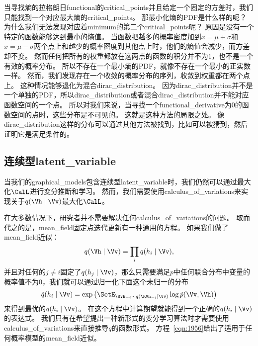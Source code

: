 当寻找熵的拉格朗日\gls{functional}的\gls{critical_points}并且给定一个固定的方差时，我们只能找到一个对应最大熵的\gls{critical_points}。
那最小化熵的\gls{PDF}是什么样的呢？
为什么我们无法发现对应着\gls{minimum}的第二个\gls{critical_points}呢？
原因是没有一个特定的函数能够达到最小的熵值。
当函数把越多的概率密度加到$x = \mu + \sigma$和$x = \mu - \sigma$两个点上和越少的概率密度到其他点上时，他们的熵值会减少，而方差却不变。
然而任何把所有的权重都放在这两点的函数的积分并不为$1$，也不是一个有效的概率分布。
所以不存在一个最小熵的\gls{PDF}，就像不存在一个最小的正实数一样。
然而，我们发现存在一个收敛的概率分布的序列，收敛到权重都在两个点上。
这种情况能够退化为混合\gls{dirac_distribution}。
因为\gls{dirac_distribution}并不是一个单独的\gls{PDF}，所以\gls{dirac_distribution}或者混合\gls{dirac_distribution}并不能对应函数空间的一个点。
所以对我们来说，当寻找一个\gls{functional_derivative}为$0$的函数空间的点时，这些分布是不可见的。
这就是这种方法的局限之处。
像\gls{dirac_distribution}这样的分布可以通过其他方法被找到，比如可以被猜到，然后证明它是满足条件的。



\subsection{连续型\gls{latent_variable}}
\label{sec:continuous_latent_variables}


当我们的\gls{graphical_models}包含连续型\gls{latent_variable}时，我们仍然可以通过最大化$\CalL$进行变分推断和学习。
然而，我们需要使用\gls{calculus_of_variations}来实现关于$q(\Vh\mid\Vv)$最大化$\CalL$。


在大多数情况下，研究者并不需要解决任何\gls{calculus_of_variations}的问题。
取而代之的是，\gls{mean_field}固定点迭代更新有一种通用的方程。
如果我们做了\gls{mean_field}近似：
\begin{align}
\label{eqn:1955}
	q(\Vh\mid\Vv) = \prod_i q(h_i \mid\Vv),
\end{align}
并且对任何的$j\neq i$固定了$q(h_j\mid\Vv)$，那么只需要满足$p$中任何联合分布中变量的概率值不为$0$，我们就可以通过归一化下面这个未归一的分布
\begin{align}
	\label{eqn:1956}
	\tilde{q}(h_i \mid\Vv) = \exp \big(\SetE_{\RVh_{-i}\sim q(\RVh_{-i}\mid\Vv)}	\log \tilde{p}(\Vv,\Vh)\big)
\end{align}
来得到最优的$q(h_i\mid\Vv)$。
在这个方程中计算期望就能得到一个正确的$q(h_i\mid\Vv)$的表达式。
我们只有在希望提出一种新形式的变分学习算法时才需要使用\gls{calculus_of_variations}来直接推导$q$的函数形式。
方程~\eqref{eqn:1956}给出了适用于任何概率模型的\gls{mean_field}近似。




